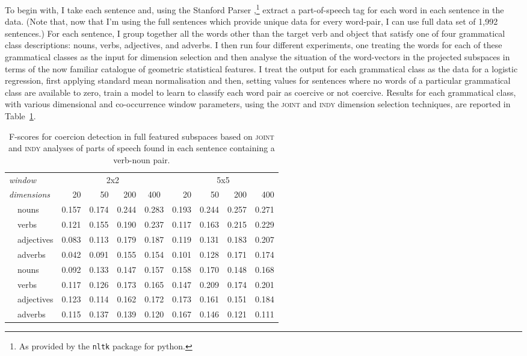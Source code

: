 To begin with, I take each sentence and, using the Stanford Parser \citep{ToutanovaEA2000},\footnote{As provided by the \texttt{nltk} package for python.} extract a part-of-speech tag for each word in each sentence in the data.  (Note that, now that I'm using the full sentences which provide unique data for every word-pair, I can use full data set of 1,992 sentences.)  For each sentence, I group together all the words other than the target verb and object that satisfy one of four grammatical class descriptions: nouns, verbs, adjectives, and adverbs.  I then run four different experiments, one treating the words for each of these grammatical classes as the input for dimension selection and then analyse the situation of the word-vectors in the projected subspaces in terms of the now familiar catalogue of geometric statistical features.  I treat the output for each grammatical class as the data for a logistic regression, first applying standard mean normalisation and then, setting values for sentences where no words of a particular grammatical class are available to zero, train a model to learn to classify each word pair as coercive or not coercive.  Results for each grammatical class, with various dimensional and co-occurrence window parameters, using the \textsc{joint} and \textsc{indy} dimension selection techniques, are reported in Table~\ref{tab:poses}.

\begin{table}
\centering
\begin{tabular}{llrrrr|rrrr}
\hline
\multicolumn{2}{l}{\emph{window}} & \multicolumn{4}{c}{2x2} & \multicolumn{4}{c}{5x5} \\
\multicolumn{2}{l}{\emph{dimensions}} & 20 & 50 & 200 & \multicolumn{1}{c}{400} & 20 & 50 & 200 & 400 \\
\hline
\parbox[t]{2mm}{} & nouns & 0.157 & 0.174 & 0.244 & 0.283 & 0.193 & 0.244 & 0.257 & 0.271 \\
& verbs & 0.121 & 0.155 & 0.190 & 0.237 & 0.117 & 0.163 & 0.215 & 0.229 \\
& adjectives & 0.083 & 0.113 & 0.179 & 0.187 & 0.119 & 0.131 & 0.183 & 0.207 \\
& adverbs & 0.042 & 0.091 & 0.155 & 0.154 & 0.101 & 0.128 & 0.171 & 0.174 \\
\hline
\parbox[t]{2mm}{} & nouns & 0.092 & 0.133 & 0.147 & 0.157 & 0.158 & 0.170 & 0.148 & 0.168 \\
& verbs & 0.117 & 0.126 & 0.173 & 0.165 & 0.147 & 0.209 & 0.174 & 0.201 \\
& adjectives & 0.123 & 0.114 & 0.162 & 0.172 & 0.173 & 0.161 & 0.151 & 0.184 \\
& adverbs & 0.115 & 0.137 & 0.139 & 0.120 & 0.167 & 0.146 & 0.121 & 0.111 \\
\hline
\end{tabular}
\caption[Correlations for Part-of-Speech Based Subspaces]{F-scores for coercion detection in full featured subspaces based on \textsc{joint} and \textsc{indy} analyses of parts of speech found in each sentence containing a verb-noun pair.}
\label{tab:poses}
\end{table}


